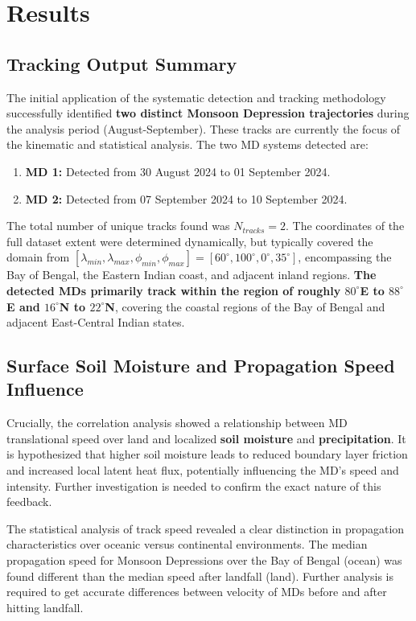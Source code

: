 \documentclass[11pt, a4paper]{article}
\begin{document}
\section{Results}

\subsection{Tracking Output Summary}
The initial application of the systematic detection and tracking methodology successfully identified \textbf{two distinct Monsoon Depression trajectories} during the analysis period (August-September). These tracks are currently the focus of the kinematic and statistical analysis.
The two MD systems detected are:
\begin{enumerate}
	\item \textbf{MD 1:} Detected from 30 August 2024 to 01 September 2024.
	\item \textbf{MD 2:} Detected from 07 September 2024 to 10 September 2024.
\end{enumerate}

The total number of unique tracks found was $N_{tracks} = 2$. The coordinates of the full dataset extent were determined dynamically, but typically covered the domain from $[\lambda_{min}, \lambda_{max}, \phi_{min}, \phi_{max}] = [60^\circ, 100^\circ, 0^\circ, 35^\circ]$, encompassing the Bay of Bengal, the Eastern Indian coast, and adjacent inland regions. \textbf{The detected MDs primarily track within the region of roughly $80^\circ$E to $88^\circ$E and $16^\circ$N to $22^\circ$N}, covering the coastal regions of the Bay of Bengal and adjacent East-Central Indian states.

\subsection{Surface Soil Moisture and Propagation Speed Influence}

Crucially, the correlation analysis showed a relationship between MD translational speed over land and localized \textbf{soil moisture} and \textbf{precipitation}. It is hypothesized that higher soil moisture leads to reduced boundary layer friction and increased local latent heat flux, potentially influencing the MD's speed and intensity. Further investigation is needed to confirm the exact nature of this feedback.

The statistical analysis of track speed revealed a clear distinction in propagation characteristics over oceanic versus continental environments. The median propagation speed for Monsoon Depressions over the Bay of Bengal (ocean) was found different than the median speed after landfall (land). Further analysis is required to get accurate differences between velocity of MDs before and after hitting landfall.
\end{document}

